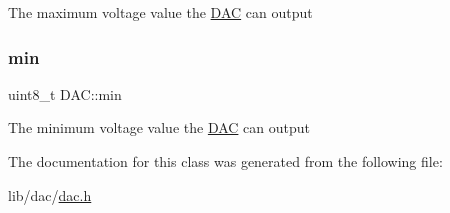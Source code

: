 The maximum voltage value the \hyperlink{class_d_a_c}{D\+AC} can output \hypertarget{class_d_a_c_aa4f21cf166374cfc6edcd412f4d2072b}{}\label{class_d_a_c_aa4f21cf166374cfc6edcd412f4d2072b} 
\subsubsection{\texorpdfstring{min}{min}}
{\footnotesize\ttfamily uint8\+\_\+t D\+A\+C\+::min\hspace{0.3cm}{\ttfamily [private]}}

The minimum voltage value the \hyperlink{class_d_a_c}{D\+AC} can output 

The documentation for this class was generated from the following file\+:\begin{DoxyCompactItemize}
\item 
lib/dac/\hyperlink{dac_8h}{dac.\+h}\end{DoxyCompactItemize}
